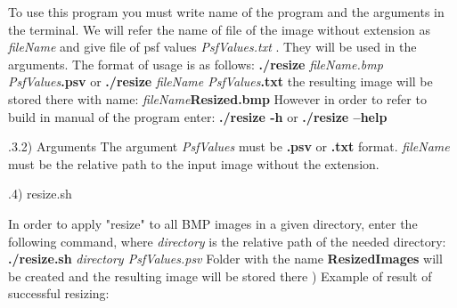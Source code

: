 \documentclass{article}
\begin{document}
To use this program you must write name of the program and the arguments in the terminal. We will refer  the name of file of the image without extension as \textit{fileName} and give file of psf values \textit{PsfValues.txt} . They will be used in the arguments. The format of usage is as follows:\newline
\indent\textbf{./resize }\textit{fileName.bmp PsfValues}\textbf{.psv}\newline
or\newline
\indent\textbf{./resize }\textit{fileName PsfValues}\textbf{.txt}\newline
 the resulting image will be stored there with name:\newline
\indent\textit{fileName}\textbf{Resized}\textit{}\textbf{.bmp}\newline
However in order to refer to build in manual of the program enter:\newline
\indent\textbf{./resize -h}\newline
or\newline
\indent\textbf{./resize  --help}

.3.2) Arguments
The argument \textit{PsfValues} must be \textbf{.psv} or \textbf{.txt} format. \textit{fileName} must be the relative path to the input image without the extension.

.4) resize.sh

In order to apply "resize" to all BMP images in a given directory, enter the following command, where \textit{directory} is the relative path of the needed directory:\newline
\indent \textbf{./resize.sh }\textit{directory PsfValues.psv}  
Folder with the name \textbf{ResizedImages} will be created and the resulting image will be stored there
) Example of result of successful resizing:

\parindent=0cm
\end{document}
